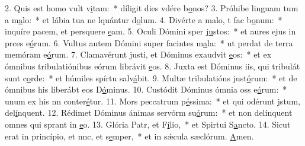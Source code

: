 2. Quis est homo  vult v\uline{i}tam:~* díligit dies vdére b\uline{o}nos?
3. Próhibe linguam tum a m\uline{a}lo:~* et lábia tua ne lquántur d\uline{o}lum.
4. Divérte a malo, t fac b\uline{o}num:~* inquíre pacem, et persquere \uline{e}am.
5. Oculi Dómini sper j\uline{u}stos:~* et aures ejus in prces e\uline{ó}rum.
6. Vultus autem Dómini super facintes m\uline{a}la:~* ut perdat de terra memóram e\uline{ó}rum.
7. Clamavérunt justi, et Dóminus exaudvit \uline{e}os:~* et ex ómnibus tribulatiónibus eórum librávit \uline{e}os.
8. Juxta est Dóminus iis, qui tribulát sunt c\uline{o}rde:~* et húmiles spírtu salv\uline{á}bit.
9. Multæ tribulatións just\uline{ó}rum:~* et de ómnibus his liberábt eos D\uline{ó}minus.
10. Custódit Dóminus ómnia oss e\uline{ó}rum:~* unum ex his nn conter\uline{é}tur.
11. Mors peccatrum p\uline{é}ssima:~* et qui odérunt jstum, del\uline{í}nquent.
12. Rédimet Dóminus ánimas servórm su\uline{ó}rum:~* et non delínquent omnes qui sprant in \uline{e}o.
13. Glória Patr, et F\uline{í}lio,~* et Spirtui S\uline{a}ncto.
14. Sicut erat in princípio, et nnc, et s\uline{e}mper,~* et in sǽcula sæclórum. \uline{A}men.
